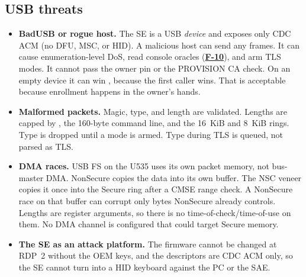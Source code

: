 \documentclass[11pt,a4paper]{article}
\newcommand{\fid}[1]{\textbf{#1}}
\begin{document}
\subsection{USB threats}
\begin{itemize}
\item \textbf{BadUSB or rogue host.} The SE is a USB \emph{device} and exposes only CDC ACM (no DFU, MSC, or HID). A malicious host can send any frames. It can cause enumeration-level DoS, read console oracles (\hyperref[f:F-10]{\fid{F-10}}), and arm TLS modes. It cannot pass the owner pin or the PROVISION CA check. On an empty device it can win , because the first caller wins. That is acceptable because enrollment happens in the owner's hands.
\item \textbf{Malformed packets.} Magic, type, and length are validated. Lengths are capped by , the 160-byte command line, and the 16~KiB and 8~KiB rings. Type  is dropped until a mode is armed. Type  during TLS is queued, not parsed as TLS.
\item \textbf{DMA races.} USB FS on the U535 uses its own packet memory, not bus-master DMA. NonSecure copies the data into its own buffer. The NSC veneer copies it once into the Secure ring after a CMSE range check. A NonSecure race on that buffer can corrupt only bytes NonSecure already controls. Lengths are register arguments, so there is no time-of-check/time-of-use on them. No DMA channel is configured that could target Secure memory.
\item \textbf{The SE as an attack platform.} The firmware cannot be changed at RDP~2 without the OEM keys, and the descriptors are CDC ACM only, so the SE cannot turn into a HID keyboard against the PC or the SAE.
\end{itemize}
\end{document}
